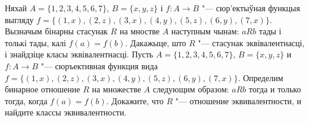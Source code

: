 \begin{problemList}
\smallskip

\problemItemSimple
{Няхай $A = \{1, 2, 3, 4, 5, 6, 7\}$, $B = \{x, y, z\}$ і $f \colon A \to B$ "--- сюр'ектыўная функцыя выгляду $f = \{(1, x), (2, z), (3, x), (4, y), (5, z), (6, y), (7, x)\}$.
Вызначым бінарны стасунак $R$ на мностве $A$ наступным чынам: $aRb$ тады і толькі тады, калі $f(a) = f(b)$. Дакажыце, што $R$ "---  стасунак эквівалентнасці, і знайдзіце класы эквівалентнасці.}
{Пусть $A = \{1, 2, 3, 4, 5, 6, 7\}$, $B = \{x, y, z\}$ и $f \colon A \to B$ "---
сюръективная функция вида $f = \{(1, x), (2, z), (3, x), (4, y), (5, z), (6, y), (7, x)\}$.
Определим бинарное отношение $R$ на множестве $A$ следующим образом: $aRb$ тогда и только тогда, когда $f(a) = f(b)$. Докажите, что $R$ "--- отношение эквивалентности, и найдите классы эквивалентности.}

\end{problemList}


